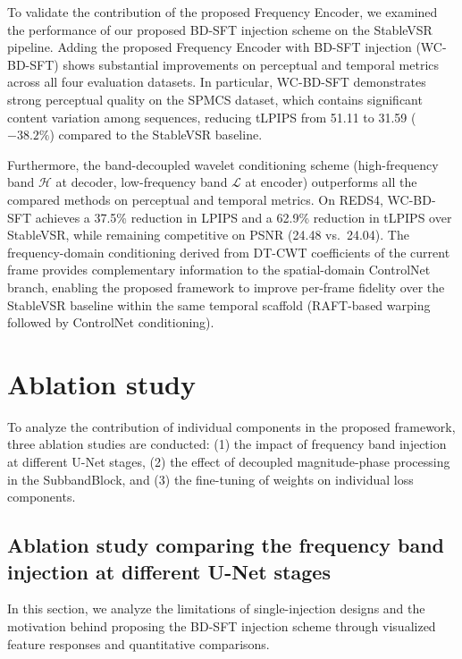 To validate the contribution of the proposed Frequency 
Encoder, we examined the performance of our proposed BD-SFT 
injection scheme on the StableVSR pipeline. Adding the 
proposed Frequency Encoder with BD-SFT injection 
(WC-BD-SFT) shows substantial improvements on perceptual and 
temporal metrics across all four evaluation datasets. In 
particular, WC-BD-SFT demonstrates strong perceptual quality 
on the SPMCS dataset, which contains significant content 
variation among sequences, reducing tLPIPS from 51.11 to 
31.59 ($-38.2\%$) compared to the StableVSR baseline.

Furthermore, the band-decoupled wavelet conditioning scheme 
(high-frequency band $\mathcal{H}$ at decoder, low-frequency 
band $\mathcal{L}$ at encoder) outperforms all the compared 
methods on perceptual and temporal metrics. On REDS4, 
WC-BD-SFT achieves a 37.5\% reduction in LPIPS and a 62.9\% 
reduction in tLPIPS over StableVSR, while remaining 
competitive on PSNR (24.48 vs.\ 24.04). The frequency-domain 
conditioning derived from DT-CWT coefficients of the current 
frame provides complementary information to the spatial-domain 
ControlNet branch, enabling the proposed framework to improve 
per-frame fidelity over the StableVSR baseline within the 
same temporal scaffold (RAFT-based warping followed by 
ControlNet conditioning).

\section{Ablation study}
\label{sec:ablation}

To analyze the contribution of individual components in the 
proposed framework, three ablation studies are conducted: 
(1) the impact of frequency band injection at different U-Net 
stages, (2) the effect of decoupled magnitude-phase processing 
in the SubbandBlock, and (3) the fine-tuning of weights on 
individual loss components.


\subsection{Ablation study comparing the frequency band 
injection at different U-Net stages}
\label{subsec:ablation_band}

In this section, we analyze the limitations of single-injection 
designs and the motivation behind proposing the BD-SFT 
injection scheme through visualized feature responses and 
quantitative comparisons.

